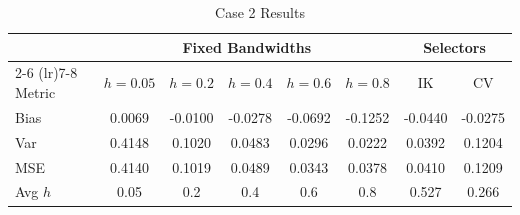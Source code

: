 \begin{table}[t!]
\centering
\caption{Case 2 Results}
\label{tab:case2}
\begin{tabular}{l ccccc cc}
\toprule
& \multicolumn{5}{c}{\textbf{Fixed Bandwidths}} & \multicolumn{2}{c}{\textbf{Selectors}} \\
\cmidrule(lr){2-6} \cmidrule(lr){7-8}
Metric & $h=0.05$ & $h=0.2$ & $h=0.4$ & $h=0.6$ & $h=0.8$ & IK & CV \\ 
\midrule
Bias & 0.0069 & -0.0100 & -0.0278 & -0.0692 & -0.1252 & -0.0440 & -0.0275 \\ 
Var & 0.4148 & 0.1020 & 0.0483 & 0.0296 & 0.0222 & 0.0392 & 0.1204 \\ 
MSE & 0.4140 & 0.1019 & 0.0489 & 0.0343 & 0.0378 & 0.0410 & 0.1209 \\ 
\addlinespace
Avg $h$ & 0.05 & 0.2 & 0.4 & 0.6 & 0.8 & 0.527 & 0.266 \\ 
\bottomrule
\end{tabular}
\end{table}
